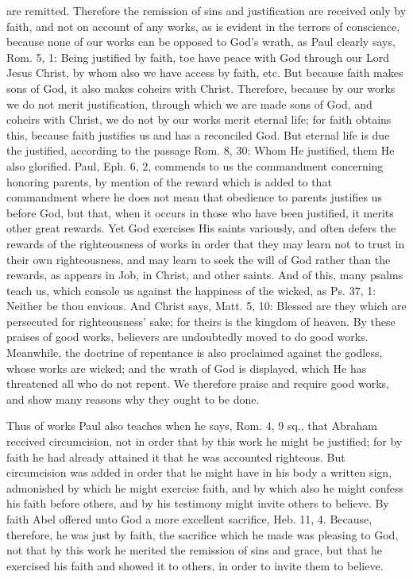 are remitted.  Therefore the remission of sins and justification are
received only by faith, and not on account of any works, as is
evident in the terrors of conscience, because none of our works can
be opposed to God's wrath, as Paul clearly says, Rom. 5, 1: Being
justified by faith, toe have peace with God through our Lord Jesus
Christ, by whom also we have access by faith, etc. But because faith
makes sons of God, it also makes coheirs with Christ.  Therefore,
because by our works we do not merit justification, through which we
are made sons of God, and coheirs with Christ, we do not by our works
merit eternal life; for faith obtains this, because faith justifies
us and has a reconciled God.  But eternal life is due the justified,
according to the passage Rom. 8, 30: Whom He justified, them He also
glorified.  Paul, Eph. 6, 2, commends to us the commandment
concerning honoring parents, by mention of the reward which is added
to that commandment where he does not mean that obedience to parents
justifies us before God, but that, when it occurs in those who have
been justified, it merits other great rewards.  Yet God exercises His
saints variously, and often defers the rewards of the righteousness
of works in order that they may learn not to trust in their own
righteousness, and may learn to seek the will of God rather than the
rewards, as appears in Job, in Christ, and other saints.  And of this,
many psalms teach us, which console us against the happiness of the
wicked, as Ps. 37, 1: Neither be thou envious.  And Christ says, Matt.
5, 10: Blessed are they which are persecuted for righteousness' sake;
for theirs is the kingdom of heaven.  By these praises of good works,
believers are undoubtedly moved to do good works.  Meanwhile, the
doctrine of repentance is also proclaimed against the godless, whose
works are wicked; and the wrath of God is displayed, which He has
threatened all who do not repent.  We therefore praise and require
good works, and show many reasons why they ought to be done.

Thus of works Paul also teaches when he says, Rom. 4, 9 sq., that
Abraham received circumcision, not in order that by this work he
might be justified; for by faith he had already attained it that he
was accounted righteous.  But circumcision was added in order that he
might have in his body a written sign, admonished by which he might
exercise faith, and by which also he might confess his faith before
others, and by his testimony might invite others to believe.  By
faith Abel offered unto God a more excellent sacrifice, Heb. 11, 4.
Because, therefore, he was just by faith, the sacrifice which he made
was pleasing to God, not that by this work he merited the remission
of sins and grace, but that he exercised his faith and showed it to
others, in order to invite them to believe.

